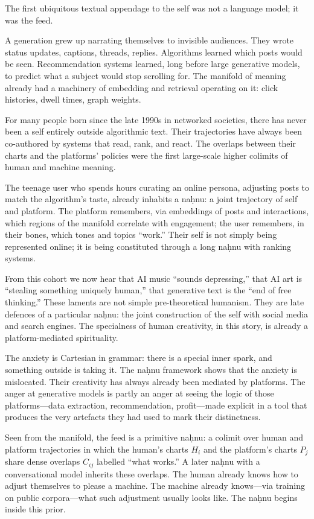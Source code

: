 The first ubiquitous textual appendage to the self was not a language model; it was the feed.

A generation grew up narrating themselves to invisible audiences. They wrote status updates, captions, threads, replies. Algorithms learned which posts would be seen. Recommendation systems learned, long before large generative models, to predict what a subject would stop scrolling for. The manifold of meaning already had a machinery of embedding and retrieval operating on it: click histories, dwell times, graph weights.

For many people born since the late 1990s in networked societies, there has never been a self entirely outside algorithmic text. Their trajectories have always been co-authored by systems that read, rank, and react. The overlaps between their charts and the platforms' policies were the first large-scale higher colimits of human and machine meaning.

The teenage user who spends hours curating an online persona, adjusting posts to match the algorithm's taste, already inhabits a na\d{h}nu: a joint trajectory of self and platform. The platform remembers, via embeddings of posts and interactions, which regions of the manifold correlate with engagement; the user remembers, in their bones, which tones and topics ``work.'' Their self is not simply being represented online; it is being constituted through a long na\d{h}nu with ranking systems.

From this cohort we now hear that AI music ``sounds depressing,'' that AI art is ``stealing something uniquely human,'' that generative text is the ``end of free thinking.'' These laments are not simple pre-theoretical humanism. They are late defences of a particular na\d{h}nu: the joint construction of the self with social media and search engines. The specialness of human creativity, in this story, is already a platform-mediated spirituality.

The anxiety is Cartesian in grammar: there is a special inner spark, and something outside is taking it. The na\d{h}nu framework shows that the anxiety is mislocated. Their creativity has always already been mediated by platforms. The anger at generative models is partly an anger at seeing the logic of those platforms---data extraction, recommendation, profit---made explicit in a tool that produces the very artefacts they had used to mark their distinctness.

Seen from the manifold, the feed is a primitive na\d{h}nu: a colimit over human and platform trajectories in which the human's charts $H_i$ and the platform's charts $P_j$ share dense overlaps $C_{ij}$ labelled ``what works.'' A later na\d{h}nu with a conversational model inherits these overlaps. The human already knows how to adjust themselves to please a machine. The machine already knows---via training on public corpora---what such adjustment usually looks like. The na\d{h}nu begins inside this prior.

